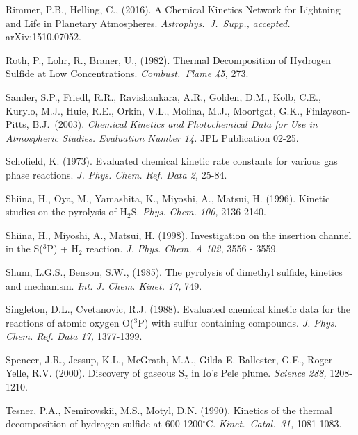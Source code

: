 \documentclass[preprint]{aastex6}
\newcounter{reaction}
\begin{document}
\begin{thebibliography}{00}
 Rimmer, P.B., Helling, C., (2016).
 A Chemical Kinetics Network for Lightning and Life in Planetary Atmospheres.
 {\em Astrophys.\ J.\ Supp.,} {\it accepted.} arXiv:1510.07052.


Roth, P., Lohr, R., Braner, U., (1982).
Thermal Decomposition of Hydrogen Sulfide at Low Concentrations.
{\em Combust.\ Flame 45,} 273.

Sander, S.P., Friedl, R.R.,  Ravishankara, A.R., Golden, D.M., Kolb, C.E., Kurylo, M.J., Huie, R.E., Orkin, V.L., Molina, M.J., Moortgat, G.K., Finlayson-Pitts, B.J.\ (2003).
{\em Chemical Kinetics and Photochemical Data for Use in Atmospheric Studies. Evaluation Number 14.} JPL Publication 02-25.

Schofield, K.  (1973).  Evaluated chemical kinetic rate constants for various gas phase reactions.  {\em J. Phys. Chem. Ref. Data 2,} 25-84.

Shiina, H., Oya, M., Yamashita, K., Miyoshi, A., Matsui, H. (1996). Kinetic studies on the pyrolysis of H$_2$S. {\em  Phys. Chem. 100,} 2136-2140.

Shiina, H., Miyoshi, A., Matsui, H. (1998). Investigation on the insertion channel in the S($^3$P) + H$_2$ reaction. 
{\em J. Phys. Chem. A 102,} 3556 - 3559.

Shum, L.G.S., Benson, S.W., (1985). 
The pyrolysis of dimethyl sulfide, kinetics and mechanism.
{\em Int. J. Chem. Kinet. 17,} 749.

Singleton, D.L., Cvetanovic, R.J.  (1988). Evaluated chemical kinetic data for the reactions of atomic oxygen O($^3$P) with sulfur containing compounds.  {\em J. Phys. Chem. Ref. Data 17,} 1377-1399.

Spencer, J.R., Jessup, K.L., McGrath, M.A., Gilda E. Ballester, G.E., Roger Yelle, R.V. (2000).
Discovery of gaseous S$_2$ in Io's Pele plume.
{\em Science 288,} 1208-1210.

Tesner, P.A., Nemirovskii, M.S., Motyl, D.N. (1990).
Kinetics of the thermal decomposition of hydrogen sulfide at 600-1200$^{\circ}$C.
{\em Kinet.\ Catal.\ 31,} 1081-1083.



\end{thebibliography}
\end{document}
